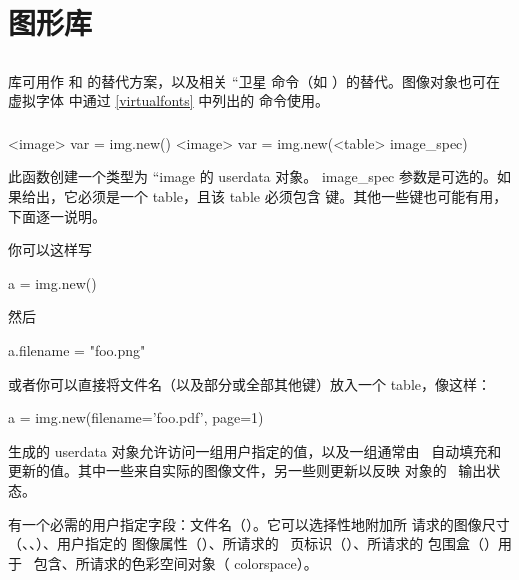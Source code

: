 
\chapter{图形库}\label{graphics}

\section{}


 库可用作  和  的替代方案，以及相关
``卫星 命令（如 \type {\pdfximagebbox}）的替代。图像对象也可在虚拟字体
中通过 \ref{virtualfonts} 中列出的  命令使用。

\subsection{}


\begin{typing}
<image> var = img.new()
<image> var = img.new(<table> image_spec)
\end{typing}

此函数创建一个类型为 ``image 的 userdata 对象。\type
{image_spec} 参数是可选的。如果给出，它必须是一个 table，且该 table 必须包含
 键。其他一些键也可能有用，下面逐一说明。

你可以这样写

\begin{typing}
a = img.new()
\end{typing}

然后

\begin{typing}
a.filename = "foo.png"
\end{typing}

或者你可以直接将文件名（以及部分或全部其他键）放入一个 table，像这样：

\begin{typing}
a = img.new({filename='foo.pdf', page=1})
\end{typing}

生成的  userdata 对象允许访问一组用户指定的值，以及一组通常由
\LUATEX\ 自动填充和更新的值。其中一些来自实际的图像文件，另一些则更新以反映
对象的 \PDF\ 输出状态。

有一个必需的用户指定字段：文件名（）。它可以选择性地附加所
请求的图像尺寸（、、）、用户指定的
图像属性（）、所请求的 \PDF\ 页标识（）、所请求的
包围盒（）用于 \PDF\ 包含、所请求的色彩空间对象（\type
{colorspace}）。


